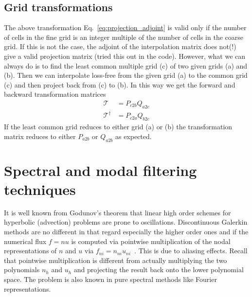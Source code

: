 \subsection{Grid transformations}
The above transformation Eq.~\eqref{eq:projection_adjoint} is
valid only if the number of cells in the fine grid is an integer multiple of the number of cells in the coarse grid. 
If this is not the case, the adjoint of the interpolation matrix
does not(!) give a valid projection matrix (tried this 
out in the code).
However, what we can always do is to find the least common multiple grid (c) of two given grids (a) and (b). Then
we can interpolate loss-free from the given grid (a) to the 
common grid (c) and then project back from (c) to (b).
In this way we get the forward and backward transformation matrices
\begin{align}
    \mathcal T &= P_{c2b}Q_{a2c}\\
    \mathcal T^\dagger &= P_{c2a} Q_{b2c}
    \label{}
\end{align}
If the least common grid reduces to either grid (a) or (b) the
transformation matrix reduces to either $P_{a2b}$ or $Q_{a2b}$ as expected.


\section{Spectral and modal filtering techniques}
It is well known from Godunov's theorem that linear high order schemes for hyperbolic (advection) problems
are prone to oscillations. Discontinuous Galerkin methods are no different in that regard
especially the higher order ones and if the numerical flux $f=nu$ is computed via pointwise multiplication
of the nodal representations of $n$ and $u$ via $f_{ni} = n_{ni} u_{ni}$~\cite{NodalDG}.
This is due to aliasing effects. Recall that pointwise multiplication is different from
actually multiplying the two polynomials $n_h$ and $u_h$ and projecting the result back onto the
lower polynomial space. The problem is also known in pure spectral methods like
Fourier representations.

